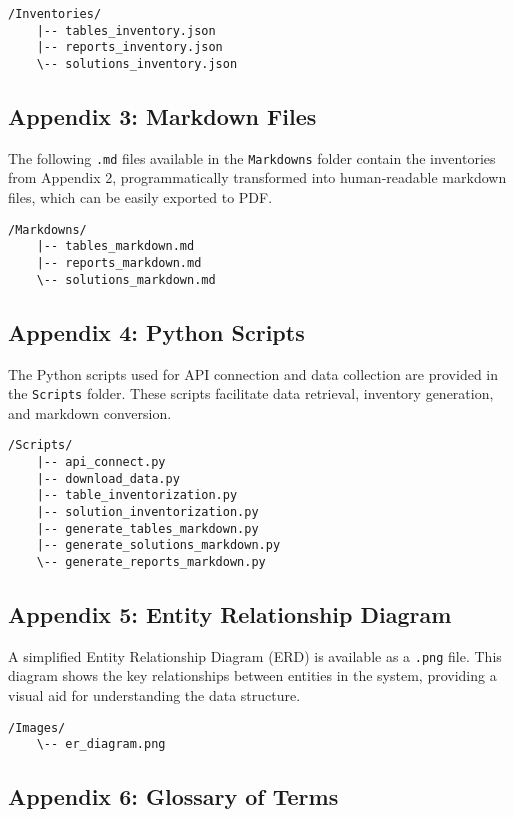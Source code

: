 \begin{verbatim}
/Inventories/
    |-- tables_inventory.json
    |-- reports_inventory.json
    \-- solutions_inventory.json
\end{verbatim}

\subsection{Appendix 3: Markdown Files}
The following \texttt{.md} files available in the \texttt{Markdowns} folder contain the inventories from Appendix 2, programmatically transformed into human-readable markdown files, which can be easily exported to PDF.

\begin{verbatim}
/Markdowns/
    |-- tables_markdown.md
    |-- reports_markdown.md
    \-- solutions_markdown.md
\end{verbatim}

\subsection{Appendix 4: Python Scripts}
The Python scripts used for API connection and data collection are provided in the \texttt{Scripts} folder. These scripts facilitate data retrieval, inventory generation, and markdown conversion.

\begin{verbatim}
/Scripts/
    |-- api_connect.py
    |-- download_data.py
    |-- table_inventorization.py
    |-- solution_inventorization.py
    |-- generate_tables_markdown.py
    |-- generate_solutions_markdown.py
    \-- generate_reports_markdown.py
\end{verbatim}

\subsection{Appendix 5: Entity Relationship Diagram}
A simplified Entity Relationship Diagram (ERD) is available as a \texttt{.png} file. This diagram shows the key relationships between entities in the system, providing a visual aid for understanding the data structure.

\begin{verbatim}
/Images/
    \-- er_diagram.png
\end{verbatim}

\newpage

\subsection{Appendix 6: Glossary of Terms}


